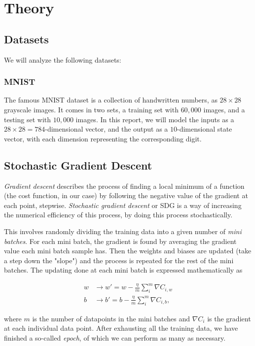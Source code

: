\documentclass[../main.tex]{subfiles}
\begin{document}
\section{Theory}
\subsection{Datasets}
We will analyze the following datasets:
\subsubsection{MNIST}
The famous MNIST dataset is a collection of handwritten numbers, as $28\times 28$ grayscale images. It comes in two sets, a training set with $60,000$ images, and a testing set with $10,000$ images. In this report, we will model the inputs as a $28\times 28 = 784$-dimensional vector, and the output as a $10$-dimensional state vector, with each dimension representing the corresponding digit.

\subsection{Stochastic Gradient Descent}
\textit{Gradient descent} describes the process of finding a local minimum of a function (the cost function, in our case) by following the negative value of the gradient at each point, stepwise. \textit{Stochastic gradient descent} or SDG is a way of increasing the numerical efficiency of this process, by doing this process stochastically.

This involves randomly dividing the training data into a given number of \textit{mini batches}. For each mini batch, the gradient is found by averaging the gradient value each mini batch sample has. Then the weights and biases are updated (take a step down the "slope") and the process is repeated for the rest of the mini batches. The updating done at each mini batch is expressed mathematically as

\begin{align*}
    w&\rightarrow w' = w - \frac{\eta}{m}\sum_i^m \nabla C_{i,w} \\
    b&\rightarrow b' = b - \frac{\eta}{m}\sum_i^m \nabla C_{i,b},
\end{align*}

where $m$ is the number of datapoints in the mini batches and $\nabla C_i$ is the gradient at each individual data point. After exhausting all the training data, we have finished a so-called \textit{epoch}, of which we can perform as many as necessary.
\end{document}
